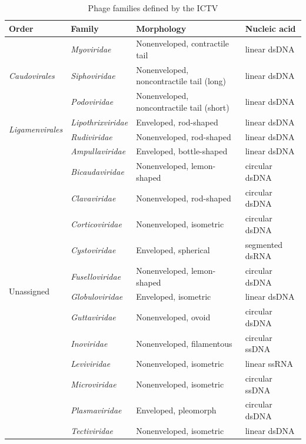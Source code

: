 \begin{table}[t]
    \caption{Phage families defined by the ICTV}
    \centering
    \scriptsize
    \begin{tabularx}{\textwidth}{lXlX}
    \toprule
    Order & Family & Morphology & Nucleic acid \\
    \midrule
    \multirow{3}{*}{\emph{Caudovirales}} & \emph{Myoviridae}   & Nonenveloped, contractile tail           & linear dsDNA \\
                                         & \emph{Siphoviridae} & Nonenveloped, noncontractile tail (long) & linear dsDNA \\
                                         & \emph{Podoviridae}  & Nonenveloped, noncontractile tail (short) & linear dsDNA \\
    \midrule
    \multirow{2}{*}{\emph{Ligamenvirales}} & \emph{Lipothrixviridae} & Enveloped, rod-shaped    & linear dsDNA \\
                                           & \emph{Rudiviridae}      & Nonenveloped, rod-shaped & linear dsDNA \\
    \midrule
    \multirow{13}{*}{Unassigned} & \emph{Ampullaviridae} & Enveloped, bottle-shaped   & linear dsDNA\\
                                 & \emph{Bicaudaviridae} & Nonenveloped, lemon-shaped & circular dsDNA \\
                                 & \emph{Clavaviridae}   & Nonenveloped, rod-shaped   & circular dsDNA \\
                                 & \emph{Corticoviridae} & Nonenveloped, isometric    & circular dsDNA \\
                                 & \emph{Cystoviridae}   & Enveloped, spherical       & segmented dsRNA \\
                                 & \emph{Fuselloviridae} & Nonenveloped, lemon-shaped & circular dsDNA \\
                                 & \emph{Globuloviridae} & Enveloped, isometric       & linear dsDNA \\
                                 & \emph{Guttaviridae}   & Nonenveloped, ovoid        & circular dsDNA \\
                                 & \emph{Inoviridae}     & Nonenveloped, filamentous  & circular ssDNA \\
                                 & \emph{Leviviridae}    & Nonenveloped, isometric    & linear ssRNA \\
                                 & \emph{Microviridae}   & Nonenveloped, isometric    & circular ssDNA \\
                                 & \emph{Plasmaviridae}  & Enveloped, pleomorph       & circular dsDNA \\
                                 & \emph{Tectiviridae}   & Nonenveloped, isometric    & linear dsDNA \\
    \bottomrule
    \end{tabularx}
    \label{phage:table:families}
\end{table}

